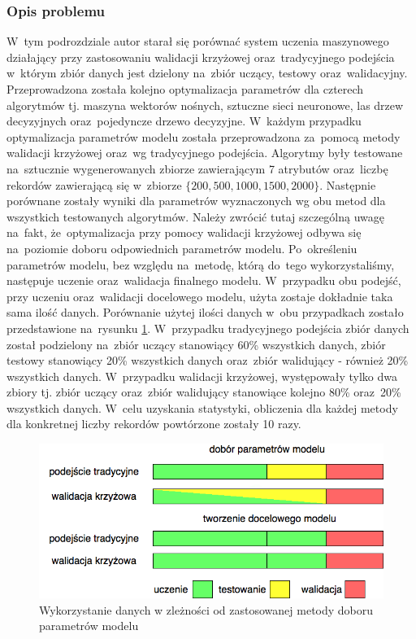 \subsubsection{Opis problemu}
W~tym podrozdziale autor starał się porównać system uczenia maszynowego działający przy zastosowaniu walidacji krzyżowej oraz~tradycyjnego podejścia w~którym zbiór danych jest dzielony na~zbiór uczący, testowy oraz~walidacyjny. Przeprowadzona została kolejno optymalizacja parametrów dla czterech algorytmów tj. maszyna wektorów nośnych, sztuczne sieci neuronowe, las drzew decyzyjnych oraz~pojedyncze drzewo decyzyjne. W~każdym przypadku optymalizacja parametrów modelu została przeprowadzona za~pomocą metody walidacji krzyżowej oraz~wg tradycyjnego podejścia.  Algorytmy były testowane na~sztucznie wygenerowanych zbiorze zawierającym 7 atrybutów oraz~liczbę rekordów zawierającą się w~zbiorze $ \{200, 500, 1000, 1500, 2000\}.$ Następnie porównane zostały wyniki dla parametrów wyznaczonych wg obu metod dla wszystkich testowanych algorytmów. Należy zwrócić tutaj szczególną uwagę na~fakt, że~optymalizacja przy pomocy walidacji krzyżowej odbywa się na~poziomie doboru odpowiednich parametrów modelu. Po~określeniu parametrów modelu, bez względu na~metodę, którą do~tego wykorzystaliśmy, następuje uczenie oraz~walidacja finalnego modelu. W~przypadku obu podejść, przy uczeniu oraz~walidacji docelowego modelu, użyta zostaje dokładnie taka sama ilość danych. Porównanie użytej ilości danych w~obu przypadkach zostało przedstawione na~rysunku \ref{cvdata}. W~przypadku tradycyjnego podejścia zbiór danych został podzielony na~zbiór uczący stanowiący 60\% wszystkich danych, zbiór testowy stanowiący 20\% wszystkich danych oraz~zbiór walidujący - również 20\% wszystkich danych. W~przypadku walidacji krzyżowej, występowały tylko dwa zbiory tj. zbiór uczący oraz~zbiór walidujący stanowiące kolejno 80\% oraz~20\% wszystkich danych. W~celu uzyskania statystyki, obliczenia dla każdej metody dla konkretnej liczby rekordów powtórzone zostały 10 razy.

\begin{figure}[ht!]
\centering
\includegraphics[scale=0.6]{res/cvdata.png}
\caption[Caption for LOF]{Wykorzystanie danych w zleżności od zastosowanej metody doboru parametrów modelu\label{cvdata}}
\end{figure} 

